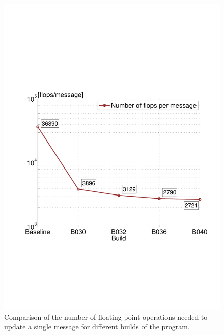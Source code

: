 \begin{figure}\centering
    \includegraphics[scale=0.47, trim={1.9cm 6.7cm 1.1cm 8.5cm},clip]{graphics/flops_per_message.pdf}
  \caption{Comparison of the number of floating point operations needed to update a single message for different builds of the program.\label{flops-per-message}}
\end{figure}

